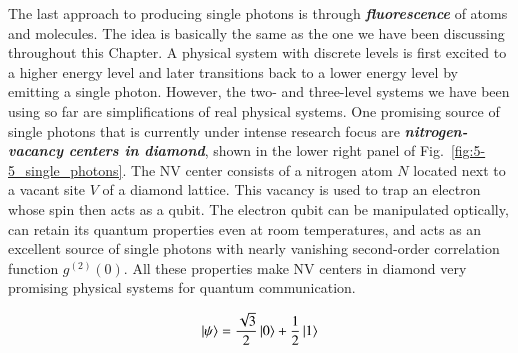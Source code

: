 The last approach to producing single photons is through \textit{\textbf{fluorescence}} of atoms and molecules.
The idea is basically the same as the one we have been discussing throughout this Chapter.
A physical system with discrete levels is first excited to a higher energy level and later transitions back to a lower energy level by emitting a single photon.
However, the two- and three-level systems we have been using so far are simplifications of real physical systems.
One promising source of single photons that is currently under intense research focus are \textit{\textbf{nitrogen-vacancy centers in diamond}}, shown in the lower right panel of Fig.~\ref{fig:5-5_single_photons}.
The NV center consists of a nitrogen atom $N$ located next to a vacant site $V$ of a diamond lattice.
This vacancy is used to trap an electron whose spin then acts as a qubit.
The electron qubit can be manipulated optically, can retain its quantum properties even at room temperatures, and acts as an excellent source of single photons with nearly vanishing second-order correlation function $g^{(2)}(0)$.
All these properties make NV centers in diamond very promising physical systems for quantum communication.


\newpage
\begin{exercises}
\begin{equation*}
\left| \psi \right\rangle = \frac{\sqrt{3}}{2}\left| 0 \right\rangle + \frac{1}{2}\left| 1 \right\rangle
\end{equation*}


\end{exercises}

